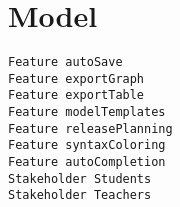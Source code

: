 \chapter{Model}


\begin{lstlisting}
Feature autoSave
Feature exportGraph
Feature exportTable
Feature modelTemplates
Feature releasePlanning
Feature syntaxColoring
Feature autoCompletion
Stakeholder Students
Stakeholder Teachers

\end{lstlisting}